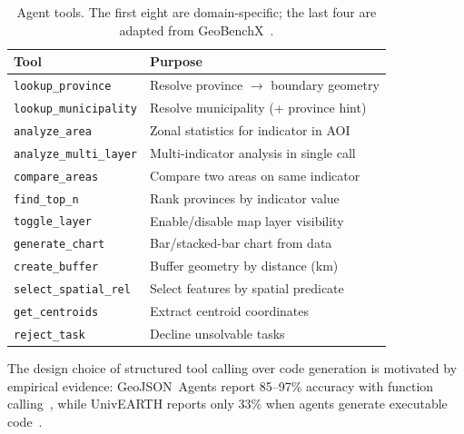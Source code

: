 \documentclass[10pt,twocolumn]{article}
\begin{document}
\begin{table}[t]
\caption{Agent tools. The first eight are domain-specific; the last four are adapted from GeoBenchX~\cite{krechetova2025geobenchx}.}
\label{tab:tools}
\centering
\small
\begin{tabular}{ll}
\toprule
\textbf{Tool} & \textbf{Purpose} \\
\midrule
\texttt{lookup\_province} & Resolve province $\to$ boundary geometry \\
\texttt{lookup\_municipality} & Resolve municipality (+ province hint) \\
\texttt{analyze\_area} & Zonal statistics for indicator in AOI \\
\texttt{analyze\_multi\_layer} & Multi-indicator analysis in single call \\
\texttt{compare\_areas} & Compare two areas on same indicator \\
\texttt{find\_top\_n} & Rank provinces by indicator value \\
\texttt{toggle\_layer} & Enable/disable map layer visibility \\
\texttt{generate\_chart} & Bar/stacked-bar chart from data \\
\midrule
\texttt{create\_buffer} & Buffer geometry by distance (km) \\
\texttt{select\_spatial\_rel} & Select features by spatial predicate \\
\texttt{get\_centroids} & Extract centroid coordinates \\
\texttt{reject\_task} & Decline unsolvable tasks \\
\bottomrule
\end{tabular}
\end{table}

The design choice of structured tool calling over code generation is motivated by empirical evidence: GeoJSON~Agents report 85--97\% accuracy with function calling~\cite{luo2025geojsonagents}, while UnivEARTH reports only 33\% when agents generate executable code~\cite{kao2025univearth}.
\end{document}
